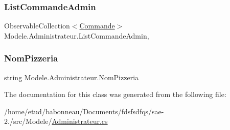 \subsubsection{\texorpdfstring{List\+Commande\+Admin}{ListCommandeAdmin}}
{\footnotesize\ttfamily Observable\+Collection$<$\hyperlink{classModele_1_1Commande}{Commande}$>$ Modele.\+Administrateur.\+List\+Commande\+Admin\hspace{0.3cm}{\ttfamily [get]}, {\ttfamily [set]}}

\mbox{\label{classModele_1_1Administrateur_addbed2fd93cf904a6703d8debd758313}} 
\subsubsection{\texorpdfstring{Nom\+Pizzeria}{NomPizzeria}}
{\footnotesize\ttfamily string Modele.\+Administrateur.\+Nom\+Pizzeria\hspace{0.3cm}{\ttfamily [get]}}



The documentation for this class was generated from the following file\+:\begin{DoxyCompactItemize}
\item 
/home/etud/babonneau/\+Documents/fdsfsdfqs/sae-\/2./src/\+Modele/\hyperlink{Administrateur_8cs}{Administrateur.\+cs}\end{DoxyCompactItemize}
